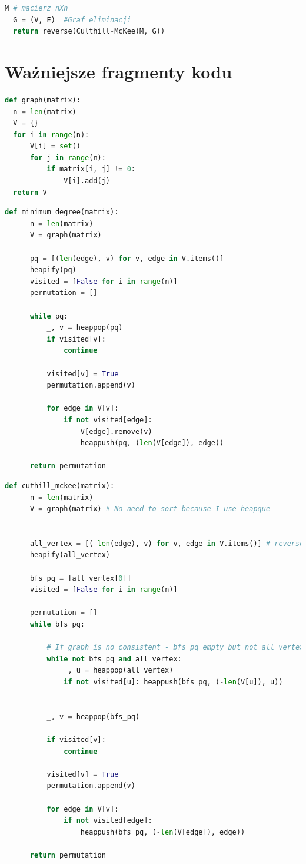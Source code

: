 \documentclass{article}
\begin{document}
\begin{lstlisting}[language=Python, caption={Reversed Culthill-McKee}]
  M # macierz nXn
  G = (V, E)  #Graf eliminacji
  return reverse(Culthill-McKee(M, G))
\end{lstlisting}


\section{Ważniejsze fragmenty kodu}
\begin{lstlisting}[language=Python, caption={tworzenie grafu eliminacji}]
  def graph(matrix):
  n = len(matrix)
  V = {}
  for i in range(n):
      V[i] = set()
      for j in range(n):
          if matrix[i, j] != 0:
              V[i].add(j)
  return V
\end{lstlisting}
\begin{lstlisting}[language=Python, caption={metoda Minimum degree}]
  def minimum_degree(matrix):
      n = len(matrix)
      V = graph(matrix)
      
      pq = [(len(edge), v) for v, edge in V.items()]
      heapify(pq)
      visited = [False for i in range(n)]
      permutation = []
      
      while pq:
          _, v = heappop(pq)
          if visited[v]:
              continue
          
          visited[v] = True
          permutation.append(v)
          
          for edge in V[v]:
              if not visited[edge]:
                  V[edge].remove(v)
                  heappush(pq, (len(V[edge]), edge))
      
      return permutation  
\end{lstlisting}
\begin{lstlisting}[language=Python, caption={metoda Culthill-McKee}]
  def cuthill_mckee(matrix):
      n = len(matrix)
      V = graph(matrix) # No need to sort because I use heapque
      
      
      all_vertex = [(-len(edge), v) for v, edge in V.items()] # reverse heap
      heapify(all_vertex)
      
      bfs_pq = [all_vertex[0]]
      visited = [False for i in range(n)]
      
      permutation = []
      while bfs_pq:
          
          # If graph is no consistent - bfs_pq empty but not all vertex visited
          while not bfs_pq and all_vertex:
              _, u = heappop(all_vertex)
              if not visited[u]: heappush(bfs_pq, (-len(V[u]), u))
              
          
          _, v = heappop(bfs_pq)
          
          if visited[v]:
              continue
          
          visited[v] = True
          permutation.append(v)
          
          for edge in V[v]:
              if not visited[edge]:
                  heappush(bfs_pq, (-len(V[edge]), edge))
      
      return permutation
\end{lstlisting}
\end{document}

